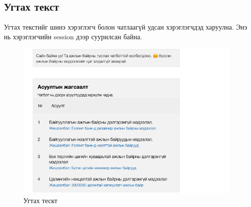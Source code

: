 \subsection{Угтах текст}
Угтах текстийг шинэ хэрэглэгч болон чатлаагүй удсан хэрэглэгчдэд харуулна. Энэ нь хэрэглэгчийн session дээр суурилсан байна. 
\begin{figure}[ht]
  \centering
  \includegraphics[width=\textwidth]{images/welcomeText.png}
  \caption{Угтах тескт}\label{fig:welcomeUI}
\end{figure}
